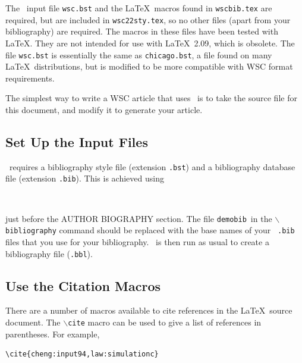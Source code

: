 \documentclass{wscpaperproc}
\theoremstyle{wsc}
\begin{document}
The \BibTeX\ input file {\tt wsc.bst} and the \LaTeX\ macros found in {\tt wscbib.tex} are required, but are included in {\tt wsc22sty.tex}, so no other files (apart from your bibliography) are required.
The macros in these files have been tested with \LaTeX. They are not intended for use with \LaTeX\ 2.09, which is obsolete.
The file {\tt wsc.bst} is essentially the same as {\tt chicago.bst}, a file found on many \LaTeX\ distributions, but is
modified to be more compatible with WSC format requirements.

The simplest way to write a WSC article that uses \BibTeX\ is to take the source file for this document, and modify it to generate your article. %

\subsection{Set Up the \texorpdfstring{\BibTeX}{BibTex} Input Files}

\BibTeX\ requires a bibliography style file (extension \texttt{.bst}) and a bibliography database file (extension \texttt{.bib}). This is achieved
using\newline


\begin{verbatim}


\end{verbatim}\vspace{5mm}

\noindent just before the AUTHOR BIOGRAPHY section. The file {\tt demobib}\ in the {\tt $\backslash$bibliography} command should be replaced with the base names of your \BibTeX\ {\tt *.bib} files that you use for your bibliography. \BibTeX\ is then run as usual to create a bibliography file ({\tt *.bbl}).

\subsection{Use the Citation Macros}
There are a number of macros available to cite references in the \LaTeX\ source document. The {\tt $\backslash$cite} macro can be used to give a list of references in parentheses. For example,\newline

\begin{verbatim}
\cite{cheng:input94,law:simulationc}
\end{verbatim}\vspace{5mm}
\end{document}

